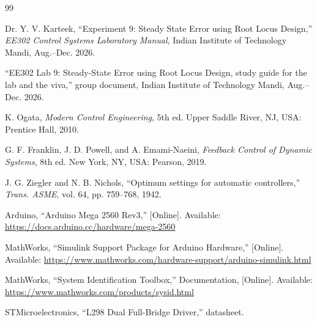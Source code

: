 \documentclass[lettersize,journal]{IEEEtran}
\begin{document}
\begin{thebibliography}{99}

Dr. Y. V. Karteek, ``Experiment 9: Steady State Error using Root Locus Design,'' \textit{EE302 Control Systems Laboratory Manual}, Indian Institute of Technology Mandi, Aug.--Dec. 2026.

``EE302 Lab 9: Steady-State Error using Root Locus Design, study guide for the lab and the viva,'' group document, Indian Institute of Technology Mandi, Aug.--Dec. 2026.

K. Ogata, \textit{Modern Control Engineering}, 5th ed. Upper Saddle River, NJ, USA: Prentice Hall, 2010.

G. F. Franklin, J. D. Powell, and A. Emami-Naeini, \textit{Feedback Control of Dynamic Systems}, 8th ed. New York, NY, USA: Pearson, 2019.

J. G. Ziegler and N. B. Nichols, ``Optimum settings for automatic controllers,'' \textit{Trans. ASME}, vol. 64, pp. 759--768, 1942.

Arduino, ``Arduino Mega 2560 Rev3,'' [Online]. Available: \url{https://docs.arduino.cc/hardware/mega-2560}

MathWorks, ``Simulink Support Package for Arduino Hardware,'' [Online]. Available: \url{https://www.mathworks.com/hardware-support/arduino-simulink.html}

MathWorks, ``System Identification Toolbox,'' Documentation, [Online]. Available: \url{https://www.mathworks.com/products/sysid.html}

STMicroelectronics, ``L298 Dual Full-Bridge Driver,'' datasheet.

\end{thebibliography}
\end{document}
